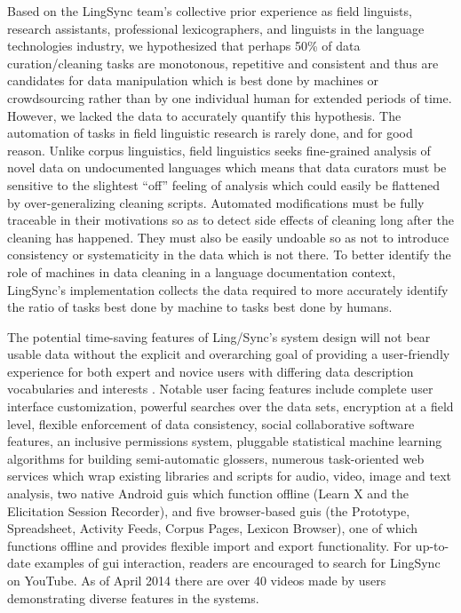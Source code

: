 \documentclass[11pt]{article}
\begin{document}
Based on the LingSync team's collective prior experience as field linguists,
research assistants, professional lexicographers, and linguists in the language
technologies industry, we hypothesized that perhaps 50\% of data
curation/cleaning tasks are monotonous, repetitive and consistent and thus are
candidates for data manipulation which is best done by machines or
crowdsourcing rather than by one individual human for extended periods of time.
However, we lacked the data to accurately quantify this hypothesis.  The
automation of tasks in field linguistic research is rarely done, and for good
reason. Unlike corpus linguistics, field linguistics seeks fine-grained
analysis of novel data on undocumented languages which means that data curators
must be sensitive to the slightest ``off'' feeling of analysis which could
easily be flattened by over-generalizing cleaning scripts.  Automated
modifications must be fully traceable in their motivations so as to detect side
effects of cleaning long after the cleaning has happened. They must also be
easily undoable so as not to introduce consistency or systematicity in the data
which is not there. To better identify the role of machines in data cleaning in
a language documentation context, LingSync's implementation collects the data
required to more accurately identify the ratio of tasks best done by machine to
tasks best done by humans. 

The potential time-saving features of Ling\-/Sync's system design will not bear
usable data without the explicit and overarching goal of providing a
user-friendly experience for both expert and novice users with differing data
description vocabularies and interests \cite{Troy:2014}.  Notable user facing
features include complete user interface customization, powerful searches over
the data sets, encryption at a field level, flexible enforcement of data
consistency, social collaborative software features, an inclusive permissions
system, pluggable statistical machine learning algorithms for building
semi-automatic glossers, numerous task-oriented web services which wrap
existing libraries and scripts for audio, video, image and text analysis, two
native Android \glspl{gui} which function offline (Learn X and the Elicitation
Session Recorder), and five browser-based \glspl{gui} (the Prototype,
Spreadsheet,  Activity Feeds, Corpus Pages, Lexicon Browser), one of which
functions offline and provides flexible import and export functionality.  For
up-to-date examples of \gls{gui} interaction, readers are encouraged to search
for LingSync on YouTube. As of April 2014 there are over 40 videos made by
users demonstrating diverse features in the systems.
\end{document}
